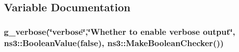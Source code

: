 \subsection{Variable Documentation}
\subsubsection[{\texorpdfstring{g\+\_\+verbose}{g_verbose}}]{ g\+\_\+verbose(\char`\"{}verbose\char`\"{},\char`\"{}Whether to enable {\bf verbose} output\char`\"{}, ns3\+::\+Boolean\+Value({\bf false}), ns3\+::\+Make\+Boolean\+Checker())\hspace{0.3cm}{\ttfamily [static]}}\hypertarget{time-probe-example_8cc_aed7570b021a1c76cbfd6d138b4278336}{}\label{time-probe-example_8cc_aed7570b021a1c76cbfd6d138b4278336}

